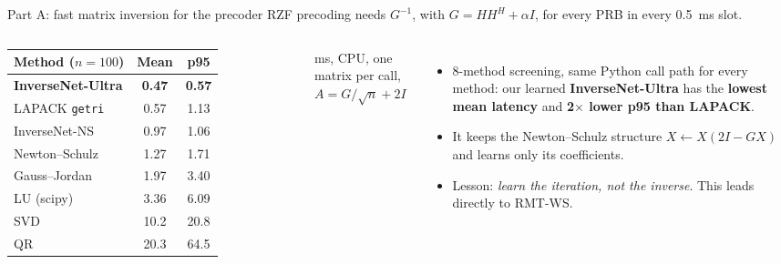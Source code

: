 \documentclass[aspectratio=169,11pt]{beamer}
\newcommand{\ours}{\rowcolor{good!15}}
\begin{document}
\begin{frame}{Part A: fast matrix inversion for the precoder}
\small
RZF precoding needs $G^{-1}$, with $G = HH^H + \alpha I$, for every PRB in every 0.5~ms slot.
\begin{columns}[c]
\centering
\begin{tabular}{lcc}
\toprule
Method ($n{=}100$) & Mean & p95 \\
\midrule
\ours \textbf{InverseNet-Ultra} & \textbf{0.47} & \textbf{0.57} \\
LAPACK \texttt{getri} & 0.57 & 1.13 \\
\ours InverseNet-NS & 0.97 & 1.06 \\
Newton--Schulz & 1.27 & 1.71 \\
Gauss--Jordan & 1.97 & 3.40 \\
LU (scipy) & 3.36 & 6.09 \\
SVD & 10.2 & 20.8 \\
QR & 20.3 & 64.5 \\
\bottomrule
\end{tabular}

{\scriptsize ms, CPU, one matrix per call, $A = G/\sqrt n + 2I$}
\begin{itemize}
  \item 8-method screening, same Python call path for every method: our learned \textbf{InverseNet-Ultra} has the \textbf{lowest mean latency} and \textbf{2$\times$ lower p95 than LAPACK}.
  \item It keeps the Newton--Schulz structure $X \leftarrow X(2I - GX)$ and learns only its coefficients.
  \item Lesson: \emph{learn the iteration, not the inverse}. This leads directly to RMT-WS.
\end{itemize}
\end{columns}
\end{frame}
\end{document}

